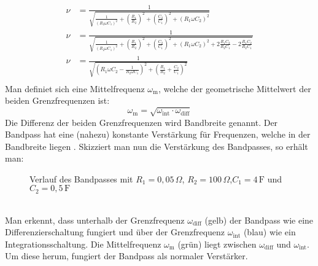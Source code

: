 \begin{align}
    \nu&=\frac{1}{\sqrt{\frac{1}{\left(R_2\omega C_1\right)^2}+\left(\frac{R_1}{R_2}\right)^2+\left(\frac{C_2}{C_1}\right)^2+\left(R_1\omega C_2\right)^2}}\\
    \nu&=\frac{1}{\sqrt{\frac{1}{\left(R_2\omega C_1\right)^2}+\left(\frac{R_1}{R_2}\right)^2+\left(\frac{C_2}{C_1}\right)^2+\left(R_1\omega C_2\right)^2+2\frac{R_1C_2}{R_2C_1}-2\frac{R_1C_2}{R_2C_1}}}\\
    \nu&=\frac{1}{\sqrt{\left(R_1\omega C_2-\frac{1}{R_2\omega C_1}\right)^2+\left(\frac{R_1}{R_2}+\frac{C_2}{C_1}\right)^2}}\\
\end{align}
Man definiet sich eine Mittelfrequenz $\omega_\text{m}$, welche der geometrische Mittelwert der beiden Grenzfrequenzen ist:
\begin{equation}
    \omega_\text{m}=\sqrt{\omega_\text{int}\cdot\omega_\text{diff}}
\end{equation}
Die Differenz der beiden Grenzfrequenzen wird Bandbreite genannt.
Der Bandpass hat eine (nahezu) konstante Verstärkung für Frequenzen, welche in der Bandbreite liegen \citep[vgl.][S.454]{HBG}.
Skizziert man nun die Verstärkung des Bandpasses, so erhält man:
\begin{figure}[h]
    \center\scalebox{0.85}{}
    \caption{Verlauf des Bandpasses mit $R_1=0,05\,\Omega$, $R_2=100\,\Omega$,$C_1=4\,\text{F}$ und $C_2=0,5\,\text{F}$}
\end{figure}\\
Man erkennt, dass unterhalb der Grenzfrequenz $\omega_\text{diff}$ (gelb) der Bandpass wie eine Differenzierschaltung fungiert und über der Grenzfrequenz $\omega_\text{int}$ (blau) wie ein Integrationsschaltung.
Die Mittelfrequenz $\omega_\text{m}$ (grün) liegt zwischen $\omega_\text{diff}$ und $\omega_\text{int}$.
Um diese herum, fungiert der Bandpass als normaler Verstärker.